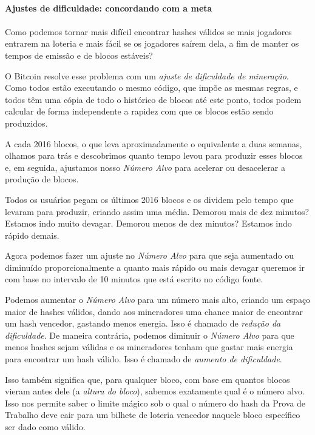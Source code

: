\paragraph{Ajustes de dificuldade: concordando com a meta}
\paragraph{}

Como podemos tornar mais difícil encontrar hashes válidos se mais jogadores entrarem na loteria e mais fácil se os jogadores saírem dela, a fim de manter os tempos de emissão e de blocos estáveis?

O Bitcoin resolve esse problema com um \textit{ajuste de dificuldade de mineração}. Como todos estão executando o mesmo código, que impõe as mesmas regras, e todos têm uma cópia de todo o histórico de blocos até este ponto, todos podem calcular de forma independente a rapidez com que os blocos estão sendo produzidos.

A cada 2016 blocos, o que leva aproximadamente o equivalente a duas semanas, olhamos para trás e descobrimos quanto tempo levou para produzir esses blocos e, em seguida, ajustamos nosso \textit{Número Alvo} para acelerar ou desacelerar a produção de blocos.

Todos os usuários pegam os últimos 2016 blocos e os dividem pelo tempo que levaram para produzir, criando assim uma média. Demorou mais de dez minutos? Estamos indo muito devagar. Demorou menos de dez minutos? Estamos indo rápido demais.

Agora podemos fazer um ajuste no \textit{Número Alvo} para que seja aumentado ou diminuído proporcionalmente a quanto mais rápido ou mais devagar queremos ir com base no intervalo de 10 minutos que está escrito no código fonte.

Podemos aumentar o \textit{Número Alvo} para um número mais alto, criando um espaço maior de hashes válidos, dando aos mineradores uma chance maior de encontrar um hash vencedor, gastando menos energia. Isso é chamado de \textit{redução da dificuldade}. De maneira contrária, podemos diminuir o \textit{Número Alvo} para que menos hashes sejam válidas e os mineradores tenham que gastar mais energia para encontrar um hash válido. Isso é chamado de \textit{aumento de dificuldade}.

Isso também significa que, para qualquer bloco, com base em quantos blocos vieram antes dele (a \textit{altura do bloco}), sabemos exatamente qual é o número alvo. Isso nos permite saber o limite mágico sob o qual o número do hash da Prova de Trabalho deve cair para um bilhete de loteria vencedor naquele bloco específico ser dado como válido.

